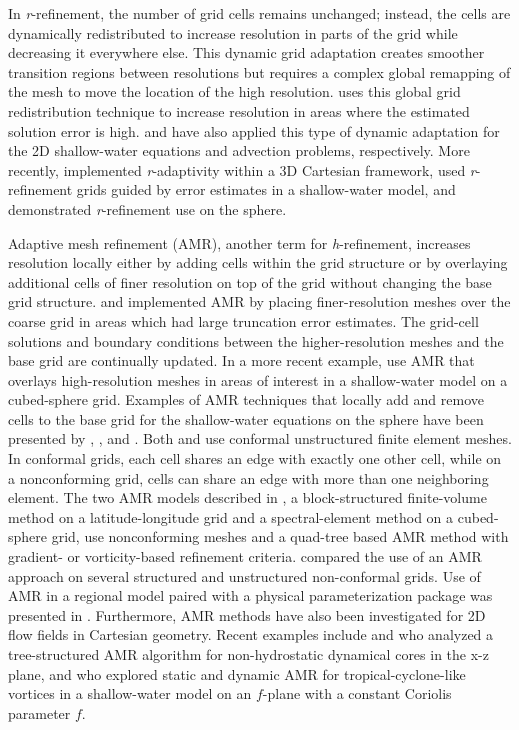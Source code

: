 In \emph{r}-refinement, the number of grid cells remains unchanged;
instead, the cells are dynamically redistributed to increase resolution
in parts of the grid while decreasing it everywhere else.  This dynamic
grid adaptation creates smoother transition regions between resolutions but
requires a complex global remapping of the mesh to move the location of
the high resolution.
\cite{Dietachmayer:1992sj} uses this global grid redistribution
technique to increase resolution in areas where the estimated solution
error is high.
\cite{giraldo2000lagrange} and
\cite{iselin2002dynamic} have also applied this type of dynamic
adaptation for the 2D shallow-water equations and advection problems,
respectively.  More recently,
\cite{kuhnlein2012modelling} implemented \emph{r}-adaptivity within a 3D
Cartesian framework,
\cite{bauer2014simulation} used \emph{r}-refinement grids guided by
error estimates in a shallow-water model, and
\cite{weller2016mesh} demonstrated \emph{r}-refinement use on the
sphere.

Adaptive mesh refinement (AMR),
another term for \emph{h}-refinement,
increases resolution locally either by adding cells within the grid
structure or by overlaying additional cells of finer resolution on top
of the grid without changing the base grid structure.
\cite{skamarock1989adaptive} and
\cite{skamarock1993adaptive} implemented AMR by placing finer-resolution
meshes over the coarse grid in areas which had large truncation error
estimates.  The grid-cell solutions and boundary conditions between the
higher-resolution meshes and the base grid are continually updated.  In
a more recent example,
\cite{Chen:2011kk} use AMR that overlays high-resolution meshes in areas
of interest in a shallow-water model on a cubed-sphere grid.
Examples of AMR techniques that locally add and remove cells to the base
grid for the shallow-water equations on the sphere have been presented
by
\cite{behrens2005amatos},
\cite{lauter2007parallel},
\cite{st2007comparison} and
\cite{marras2015simulation}.  Both
\cite{behrens2005amatos} and
\cite{lauter2007parallel} use conformal unstructured finite element
meshes.  In conformal grids, each cell shares an edge with exactly one
other cell, while on a nonconforming grid, cells can share an edge with
more than one neighboring element.  The two AMR models described in
\cite{st2007comparison}, a block-structured finite-volume method on a
latitude-longitude grid and a spectral-element method on a cubed-sphere
grid, use nonconforming meshes and a quad-tree based AMR method with
gradient- or vorticity-based refinement criteria.
\cite{marras2015simulation} compared the use of an AMR approach on
several structured and unstructured non-conformal grids.  Use of AMR in a
regional model paired with a physical parameterization package was
presented in \cite{bacon2000dynamically}.
Furthermore, AMR methods have also been investigated for 
2D flow fields in Cartesian geometry. Recent examples include 
\cite{muller2013comparison} and \cite{kopera2014analysis} 
who analyzed a tree-structured AMR algorithm for 
non-hydrostatic dynamical cores in the x-z plane, and  
\cite{hendricks2016evaluation} who explored static and dynamic AMR for 
tropical-cyclone-like vortices in a shallow-water model 
on an $f$-plane with a constant Coriolis parameter $f$.

